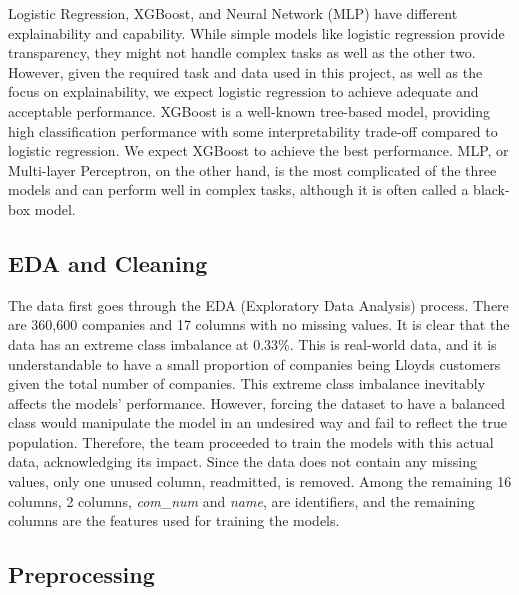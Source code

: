 \documentclass[ %
                    author={Natchalin Iwsakul \\[0.4em] Inkaphol Siriwongwattana \\[0.4em] Tanaphan Kummaraphat \\[0.6em] Patorn Srisupap},,
                supervisor={Fernando Moreno-Pino},
                    degree={MSc},
                     title={Propensity Modelling for SME Commercial Lending Using Open Public Data
},
                  subtitle={Companies House and GDELT as predictors of first-time borrowing},
                      type={},
                      year={2026}]{dissertation}
\begin{document}
  Logistic Regression, XGBoost, and Neural Network (MLP) have different explainability and capability. While simple models like logistic regression provide transparency, they might not handle complex tasks as well as the other two. However, given the required task and data used in this project, as well as the focus on explainability, we expect logistic regression to achieve adequate and acceptable performance. XGBoost is a well-known tree-based model, providing high classification performance with some interpretability trade-off compared to logistic regression. We expect XGBoost to achieve the best performance. MLP, or Multi-layer Perceptron, on the other hand, is the most complicated of the three models and can perform well in complex tasks, although it is often called a black-box model.

  \subsection{EDA and Cleaning}
  The data first goes through the EDA (Exploratory Data Analysis) process. There are 360,600 companies and 17 columns with no missing values. It is clear that the data has an extreme class imbalance at 0.33\%. This is real-world data, and it is understandable to have a small proportion of companies being Lloyds customers given the total number of companies. This extreme class imbalance inevitably affects the models' performance. However, forcing the dataset to have a balanced class would manipulate the model in an undesired way and fail to reflect the true population. Therefore, the team proceeded to train the models with this actual data, acknowledging its impact. Since the data does not contain any missing values, only one unused column, readmitted, is removed. Among the remaining 16 columns, 2 columns, \textit{com\_num} and \textit{name}, are identifiers, and the remaining columns are the features used for training the models.

  \subsection{Preprocessing}
  
\end{document}
